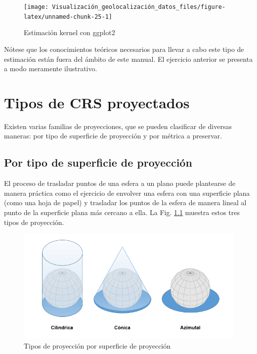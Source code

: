 \documentclass[
]{book}
\theoremstyle{definition}
\theoremstyle{definition}
\theoremstyle{definition}
\theoremstyle{definition}
\theoremstyle{remark}
\begin{document}
\begin{figure}

{\centering \texttt{[image: Visualización\_geolocalización\_datos\_files/figure-latex/unnamed-chunk-25-1]} 

}

\caption{Estimación kernel con ggplot2}\label{fig:unnamed-chunk-25}
\end{figure}

Nótese que los conocimientos teóricos necesarios para llevar a cabo este tipo de
estimación están fuera del ámbito de este manual. El ejercicio anterior se
presenta a modo meramente ilustrativo.

\hypertarget{appendix-anexo}{%
\appendix}


\hypertarget{crsproy}{%
\chapter{Tipos de CRS proyectados}\label{crsproy}}

Existen varias familias de proyecciones, que se pueden clasificar de diversas
maneras: por tipo de superficie de proyección y por métrica a preservar.

\hypertarget{por-tipo-de-superficie-de-proyecciuxf3n}{%
\section{Por tipo de superficie de proyección}\label{por-tipo-de-superficie-de-proyecciuxf3n}}

El proceso de trasladar puntos de una esfera a un plano puede plantearse de
manera práctica como el ejercicio de envolver una esfera con una superficie
plana (como una hoja de papel) y trasladar los puntos de la esfera de manera
lineal al punto de la superficie plana más cercano a ella. La Fig.
\ref{fig:fi-proys} muestra estos tres tipos de proyección.

\begin{figure}

{\centering \includegraphics[width=0.6\linewidth]{img/tipos_proy} 

}

\caption{Tipos de proyección por superficie de proyección}\label{fig:fi-proys}
\end{figure}
\end{document}
